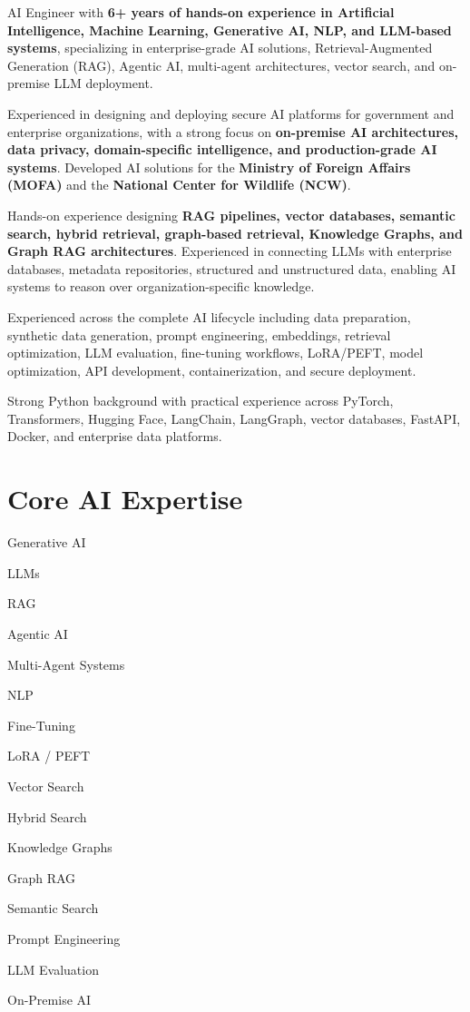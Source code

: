 \documentclass[letterpaper,11pt]{article}
\newcommand{\techtag}[1]{
  {\small\colorbox{techbg}{\textcolor{primary}{#1}}}
}
\begin{document}
\small{

AI Engineer with \textbf{6+ years of hands-on experience in Artificial Intelligence, Machine Learning, Generative AI, NLP, and LLM-based systems}, specializing in enterprise-grade AI solutions, Retrieval-Augmented Generation (RAG), Agentic AI, multi-agent architectures, vector search, and on-premise LLM deployment.

Experienced in designing and deploying secure AI platforms for government and enterprise organizations, with a strong focus on \textbf{on-premise AI architectures, data privacy, domain-specific intelligence, and production-grade AI systems}. Developed AI solutions for the \textbf{Ministry of Foreign Affairs (MOFA)} and the \textbf{National Center for Wildlife (NCW)}.

Hands-on experience designing \textbf{RAG pipelines, vector databases, semantic search, hybrid retrieval, graph-based retrieval, Knowledge Graphs, and Graph RAG architectures}. Experienced in connecting LLMs with enterprise databases, metadata repositories, structured and unstructured data, enabling AI systems to reason over organization-specific knowledge.

Experienced across the complete AI lifecycle including data preparation, synthetic data generation, prompt engineering, embeddings, retrieval optimization, LLM evaluation, fine-tuning workflows, LoRA/PEFT, model optimization, API development, containerization, and secure deployment.

Strong Python background with practical experience across PyTorch, Transformers, Hugging Face, LangChain, LangGraph, vector databases, FastAPI, Docker, and enterprise data platforms.
}



\section{Core AI Expertise}

\begin{center}

\techtag{Generative AI}
\techtag{LLMs}
\techtag{RAG}
\techtag{Agentic AI}
\techtag{Multi-Agent Systems}
\techtag{NLP}
\techtag{Fine-Tuning}
\techtag{LoRA / PEFT}
\techtag{Vector Search}
\techtag{Hybrid Search}
\techtag{Knowledge Graphs}
\techtag{Graph RAG}
\techtag{Semantic Search}
\techtag{Prompt Engineering}
\techtag{LLM Evaluation}
\techtag{On-Premise AI}

\end{center}
\end{document}
